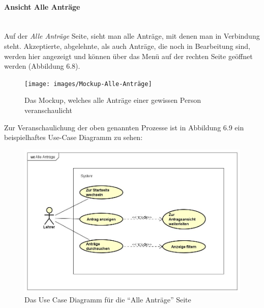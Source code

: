 \paragraph{Ansicht Alle Anträge}
~\\
Auf der \textit{Alle Anträge} Seite, sieht man alle Anträge, mit denen man in Verbindung steht. Akzeptierte, abgelehnte, als auch Anträge, die noch in Bearbeitung sind, werden hier angezeigt und können über das Menü auf der rechten Seite geöffnet werden (Abbildung 6.8).
\begin{figure}[H]
	\centering
	\texttt{[image: images/Mockup-Alle-Anträge]}
	\caption[Mockup Alle Anträge]{Das Mockup, welches alle Anträge einer gewissen Person veranschaulicht}
	\label{fig:mockupAlle}
\end{figure}
Zur Veranschaulichung der oben genannten Prozesse ist in Abbildung 6.9 ein beispielhaftes Use-Case Diagramm zu sehen: 
\begin{figure}[H]
	\centering
	\includegraphics[width=1\linewidth]{images/uc-all}
	\caption[Use Case Diagramm Alle Anträge]{Das Use Case Diagramm für die \enquote{Alle Anträge} Seite}
	\label{fig:ucAll}
\end{figure}
\newpage
